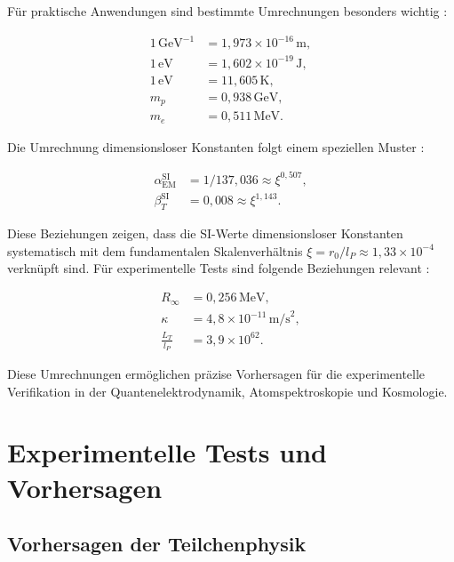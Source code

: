 \documentclass[twocolumn,aps,prl]{revtex4-2}
\begin{document}
		Für praktische Anwendungen sind bestimmte Umrechnungen besonders wichtig \cite{pascher_alpha_2025}:
		
		\begin{align}
			1 \, \text{GeV}^{-1} &= 1,973 \times 10^{-16} \, \text{m}, \label{eq:gev_to_m} \\
			1 \, \text{eV} &= 1,602 \times 10^{-19} \, \text{J}, \label{eq:ev_to_j} \\
			1 \, \text{eV} &= 11,605 \, \text{K}, \label{eq:ev_to_k} \\
			m_p &= 0,938 \, \text{GeV}, \label{eq:proton_mass} \\
			m_e &= 0,511 \, \text{MeV}. \label{eq:electron_mass}
		\end{align}
		
		Die Umrechnung dimensionsloser Konstanten folgt einem speziellen Muster \cite{pascher_beta_2025}:
		
		\begin{align}
			\alpha_{\text{EM}}^{\text{SI}} &= 1/137,036 \approx \xi^{0,507}, \label{eq:alpha_em_si} \\
			\beta_T^{\text{SI}} &= 0,008 \approx \xi^{1,143}. \label{eq:beta_t_si}
		\end{align}
		
		Diese Beziehungen zeigen, dass die SI-Werte dimensionsloser Konstanten systematisch mit dem fundamentalen Skalenverhältnis $\xi = r_0/l_P \approx 1,33 \times 10^{-4}$ verknüpft sind. Für experimentelle Tests sind folgende Beziehungen relevant \cite{pascher_alpha_2025}:
		
		\begin{align}
			R_{\infty} &= 0,256 \, \text{MeV}, \label{eq:rydberg} \\
			\kappa &= 4,8 \times 10^{-11} \, \text{m/s}^2, \label{eq:kappa} \\
			\frac{L_T}{l_P} &= 3,9 \times 10^{62}. \label{eq:lt_to_lp}
		\end{align}
		
		Diese Umrechnungen ermöglichen präzise Vorhersagen für die experimentelle Verifikation in der Quantenelektrodynamik, Atomspektroskopie und Kosmologie.
		
		\section{Experimentelle Tests und Vorhersagen}
		\label{sec:outlook}
		
		\subsection{Vorhersagen der Teilchenphysik}
		\label{subsec:particle_predictions}
		
\end{document}
